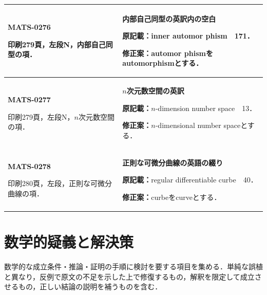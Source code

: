 \documentclass[a4paper,10pt]{ltjsarticle}
\begin{document}
\begin{longtable}{@{}>{\raggedright\arraybackslash}p{.19\linewidth}>{\raggedright\arraybackslash}p{.77\linewidth}@{}}
\hline
\hypertarget{MATS-0276}{}\textbf{MATS-0276}\par 印刷279頁，左段N，内部自己同型の項． & \textbf{内部自己同型の英訳内の空白}\par\textbf{原記載：}inner automor phism　171．\par\textbf{修正案：}automor phismをautomorphismとする． \\[3pt]
\hline
\hypertarget{MATS-0277}{}\textbf{MATS-0277}\par 印刷279頁，左段N，$n$次元数空間の項． & \textbf{$n$次元数空間の英訳}\par\textbf{原記載：}$n$-dimension number space　13．\par\textbf{修正案：}$n$-dimensional number spaceとする． \\[3pt]
\hline
\hypertarget{MATS-0278}{}\textbf{MATS-0278}\par 印刷280頁，左段，正則な可微分曲線の項． & \textbf{正則な可微分曲線の英語の綴り}\par\textbf{原記載：}regular differentiable curbe　40．\par\textbf{修正案：}curbeをcurveとする． \\[3pt]
\hline
\end{longtable}
\normalsize
\clearpage\section{数学的疑義と解決策}\label{part:math}
数学的な成立条件・推論・証明の手順に検討を要する項目を集める．単純な誤植と異なり，反例で原文の不足を示した上で修復するもの，解釈を限定して成立させるもの，正しい結論の説明を補うものを含む．
\end{document}
